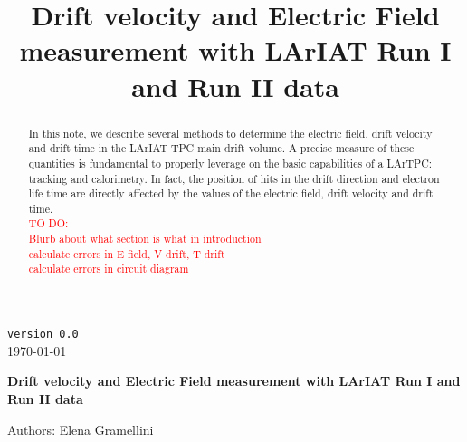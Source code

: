 \documentclass[a4paper]{article}
\title{Drift velocity and Electric Field measurement with LArIAT Run I and Run II data}
\begin{document}
\def\Journal#1#2#3#4{{#1} {\bf #2}, #3 (#4)}
\def\etal{{\it et\ al.}}
\def\numunue{\nu_\mu\rightarrow\nu_e}
\def\numunutau{\nu_\mu\rightarrow\nu_\tau}
\def\nuebar{\bar\nu_e}
\def\nue{\nu_e}
\def\nutau{\nu_\tau}
\def\numubar{\bar\nu_\mu}
\def\numu{\nu_\mu}
\def\ra{\rightarrow}
\def\numubarnuebar{\bar\nu_\mu\rightarrow\bar\nu_e}
\def\nuebarnumubar{\bar\nu_e\rightarrow\bar\nu_\mu}
\def\osc{\rightsquigarrow}
\def\inteni{{\cal I}_{pot}}
\def\fmerit{{\cal F}}
\begin{flushright}
{\tt version 0.0}\\ 
\today
\end{flushright}
\vspace*{0.6cm}
\begin{center}
{\Large \bf Drift velocity and Electric Field measurement with LArIAT Run I and Run II data} 
\vspace*{1.6cm}
\setcounter{footnote}{0}  
\def\A{\kern+.6ex\lower.42ex\hbox{$\scriptstyle \iota$}\kern-1.20ex a}
\def\E{\kern+.5ex\lower.42ex\hbox{$\scriptstyle \iota$}\kern-1.10ex e}
\small
\newcommand{\Aname}[2]{#1}
\def\titlefoot#1{\vspace{-0.3cm}\begin{center}{\bf #1}\end{center}}

Authors: Elena Gramellini \\

\end{center}
\vspace*{1cm}


\begin{abstract}
In this note, we describe several methods to determine the electric field, drift velocity and drift time in the LArIAT TPC main drift volume. 
A precise measure of these quantities is fundamental to properly leverage on the basic capabilities of a LArTPC: tracking and calorimetry. In fact, the position of hits in the drift direction and electron life time are directly affected by the values of the electric field, drift velocity and drift time.\\
\textcolor{red}{TO DO:\\
Blurb about what section is what in introduction\\
calculate errors in E field, V drift, T drift\\
calculate errors in circuit diagram\\}
\end{abstract} 
\end{document}
